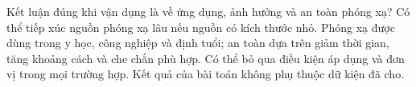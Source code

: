 \begin{ex}
Kết luận đúng khi vận dụng là về ứng dụng, ảnh hưởng và an toàn phóng xạ?
\choice
{Có thể tiếp xúc nguồn phóng xạ lâu nếu nguồn có kích thước nhỏ.}
{\True Phóng xạ được dùng trong y học, công nghiệp và định tuổi; an toàn dựa trên giảm thời gian, tăng khoảng cách và che chắn phù hợp.}
{Có thể bỏ qua điều kiện áp dụng và đơn vị trong mọi trường hợp.}
{Kết quả của bài toán không phụ thuộc dữ kiện đã cho.}
\end{ex}
